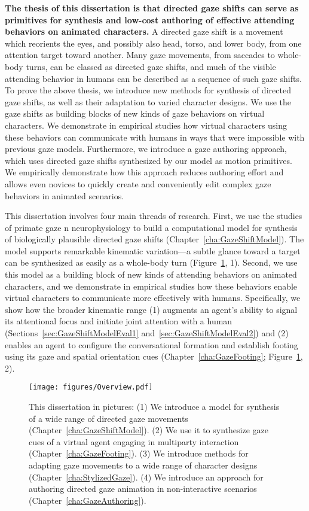 \textbf{The thesis of this dissertation is that directed gaze shifts can serve as primitives for synthesis and low-cost authoring of effective attending behaviors on animated characters.}
A directed gaze shift is a movement which reorients the eyes, and possibly also head, torso, and lower body, from one attention target toward another. Many gaze movements, from saccades to whole-body turns, can be classed as directed gaze shifts, and much of the visible attending behavior in humans can be described as a sequence of such gaze shifts.
To prove the above thesis, we introduce new methods for synthesis of directed gaze shifts, as well as their adaptation to varied character designs. We use the gaze shifts as building blocks of new kinds of gaze behaviors on virtual characters. We demonstrate in empirical studies how virtual characters using these behaviors can communicate with humans in ways that were impossible with previous gaze models. Furthermore, we introduce a gaze authoring approach, which uses directed gaze shifts synthesized by our model as motion primitives. We empirically demonstrate how this approach reduces authoring effort and allows even novices to quickly create and conveniently edit complex gaze behaviors in animated scenarios.

This dissertation involves four main threads of research. First, we use the studies of primate gaze n neurophysiology to build a computational model for synthesis of biologically plausible directed gaze shifts (Chapter~\ref{cha:GazeShiftModel}). The model supports remarkable kinematic variation---a subtle glance toward a target can be synthesized as easily as a whole-body turn (Figure~\ref{fig:Overview}, 1).
Second, we use this model as a building block of new kinds of attending behaviors on animated characters, and we demonstrate in empirical studies how these behaviors enable virtual characters to communicate more effectively with humans.
Specifically, we show how the broader kinematic range (1) augments an agent's ability to signal its attentional focus and initiate joint attention with a human (Sections~\ref{sec:GazeShiftModelEval1} and~\ref{sec:GazeShiftModelEval2}) and (2) enables an agent to configure the conversational formation and establish footing using its gaze and spatial orientation cues (Chapter~\ref{cha:GazeFooting}; Figure~\ref{fig:Overview}, 2).

\begin{figure}
\centering
\texttt{[image: figures/Overview.pdf]}
\caption{This dissertation in pictures: (1) We introduce a model for synthesis of a wide range of directed gaze movements (Chapter~\ref{cha:GazeShiftModel}). (2) We use it to synthesize gaze cues of a virtual agent engaging in multiparty interaction (Chapter~\ref{cha:GazeFooting}). (3) We introduce methods for adapting gaze movements to a wide range of character designs (Chapter~\ref{cha:StylizedGaze}). (4) We introduce an approach for authoring directed gaze animation in non-interactive scenarios (Chapter~\ref{cha:GazeAuthoring}).}
\label{fig:Overview}
\end{figure}

